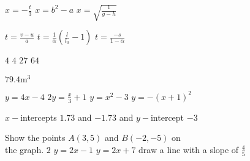 \begin{Answer}[ref={ex12}]%
	
\Question %
\begin{tasks}
	\task $x=-\frac{t}{3}$
	\task $x=b^2-a$
	\task $x=\sqrt{\frac{1}{g-h}}$
\end{tasks}
	
	\Question %
\begin{tasks}
	\task 	$t =\frac{v -u}{a}$ 
	\task   $t =\frac{1}{\alpha } \left (\frac{l}{l_{0}} -1\right )$
	\task 	$t=\frac{-s}{1-\alpha}$
\end{tasks}

\Question %
\begin{tasks}
	\task 	 $4$
	\task    $4$	
	\task 	 $27$
	\task    $64$
\end{tasks}

\Question $79.4 \mathrm{m}^{3}$

\Question %
\begin{tasks}
	\task 	 $y=4x-4$
	\task    $2y=\frac{x}{3}+1$	
	\task 	 $y =x^{2} -3$ 
	\task    $y =-(x+1)^{2}$ 
\end{tasks}

\Question %
$x-$intercepts $1.73$ and $ -1.73$ and $y-$intercept $ -3$

\Question %
\begin{tasks}
\task 	 Show the points $A \left (3 ,5\right )$ and $B \left ( -2 , -5\right )$ on\\ the graph.%
\task    $2$	
\task 	$y =2 x -1$ 
\task  $y =2 x +7$
\task  draw a line with a slope of $\frac{4}{5}$
\end{tasks}


\end{Answer}

